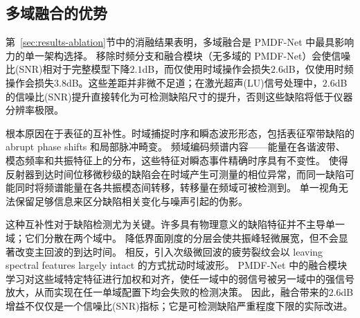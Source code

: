 \subsection{多域融合的优势}
\label{sec:discussion-fusion}

第~\ref{sec:results-ablation}节中的消融结果表明，多域融合是 PMDF-Net 中最具影响力的单一架构选择。
移除时频分支和融合模块（无多域的 PMDF-Net）会使信噪比(SNR)相对于完整模型下降$2.1$dB，而仅使用时域操作会损失$2.6$dB，仅使用时频操作会损失$3.8$dB。这些差距并非微不足道；在激光超声(LU)信号处理中，$2.6$dB 的信噪比(SNR)提升直接转化为可检测缺陷尺寸的提升，否则这些缺陷将低于仪器分辨率极限。

根本原因在于表征的互补性。时域捕捉时序和瞬态波形形态，包括表征窄带缺陷的 abrupt phase shifts 和局部脉冲畸变。
频域编码频谱内容——能量在各谐波带、模态频率和共振特征上的分布，这些特征对瞬态事件精确时序具有不变性。
使得反射器到达时间位移微秒级的缺陷会在时域产生可测量的相位异常，而同一缺陷可能同时将频谱能量在各共振模态间转移，转移量在频域可被检测到。
单一视角无法保留足够信息来区分缺陷相关变化与噪声引起的伪影。

这种互补性对于缺陷检测尤为关键。许多具有物理意义的缺陷特征并不主导单一域；它们分散在两个域中。
降低界面刚度的分层会使共振峰轻微展宽，但不会显著改变主回波的到达时间。
相反，引入次级微回波的疲劳裂纹会以 leaving spectral features largely intact 的方式扰动时域波形。
PMDF-Net 中的融合模块学习对这些域特定特征进行加权和对齐，使任一域中的弱信号被另一域中的强信号放大，从而实现在任一单域配置下均会失败的检测决策。
因此，融合带来的$2.6$dB 增益不仅仅是一个信噪比(SNR)指标；它是可检测缺陷严重程度下限的实际改进。